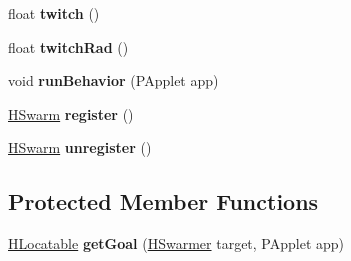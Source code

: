\begin{DoxyCompactItemize}
\item 
\hypertarget{classhype_1_1behavior_1_1_h_swarm_ac2e03a345f2060a9b1031a032610a254}{float {\bfseries twitch} ()}\label{classhype_1_1behavior_1_1_h_swarm_ac2e03a345f2060a9b1031a032610a254}

\item 
\hypertarget{classhype_1_1behavior_1_1_h_swarm_a1c8e689465a9d5fe631bc82048f5b92f}{float {\bfseries twitch\-Rad} ()}\label{classhype_1_1behavior_1_1_h_swarm_a1c8e689465a9d5fe631bc82048f5b92f}

\item 
\hypertarget{classhype_1_1behavior_1_1_h_swarm_ac6740ebc12f11d4b601e2b41602852fc}{void {\bfseries run\-Behavior} (P\-Applet app)}\label{classhype_1_1behavior_1_1_h_swarm_ac6740ebc12f11d4b601e2b41602852fc}

\item 
\hypertarget{classhype_1_1behavior_1_1_h_swarm_aed2bec15f13b547c9102186b9d5aeede}{\hyperlink{classhype_1_1behavior_1_1_h_swarm}{H\-Swarm} {\bfseries register} ()}\label{classhype_1_1behavior_1_1_h_swarm_aed2bec15f13b547c9102186b9d5aeede}

\item 
\hypertarget{classhype_1_1behavior_1_1_h_swarm_a421e4284f278470402c8fab4b262a01f}{\hyperlink{classhype_1_1behavior_1_1_h_swarm}{H\-Swarm} {\bfseries unregister} ()}\label{classhype_1_1behavior_1_1_h_swarm_a421e4284f278470402c8fab4b262a01f}

\end{DoxyCompactItemize}
\subsection*{Protected Member Functions}
\begin{DoxyCompactItemize}
\item 
\hypertarget{classhype_1_1behavior_1_1_h_swarm_a59001a8cf3c6e29e5f5f57dc5e822f4c}{\hyperlink{interfacehype_1_1interfaces_1_1_h_locatable}{H\-Locatable} {\bfseries get\-Goal} (\hyperlink{interfacehype_1_1interfaces_1_1_h_swarmer}{H\-Swarmer} target, P\-Applet app)}\label{classhype_1_1behavior_1_1_h_swarm_a59001a8cf3c6e29e5f5f57dc5e822f4c}

\end{DoxyCompactItemize}
